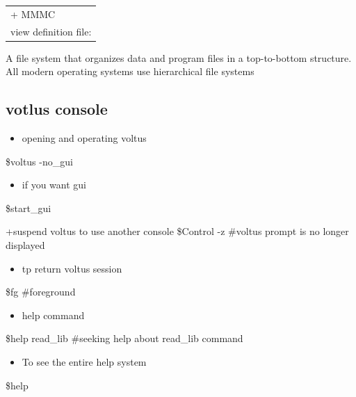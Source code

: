 \documentclass[a4paper]{article}
\begin{document}
\begin{center}
\begin{tabular}{l}
+ MMMC\\
view definition file:\\
\end{tabular}
\end{center}



A file system that organizes data and program files in a top-to-bottom structure.
All modern operating systems use hierarchical file systems


\subsection{votlus console}
\label{sec:org5fe3c40}
\begin{itemize}
\item opening and operating voltus
\end{itemize}
\$voltus -no\_gui
\begin{itemize}
\item if you want gui
\end{itemize}
\$start\_gui  

+suspend voltus to use another console
\$Control -z   \#voltus prompt is no longer displayed

\begin{itemize}
\item tp return voltus session
\end{itemize}
\$fg   \#foreground

\begin{itemize}
\item help command
\end{itemize}
\$help read\_lib    \#seeking help about read\_lib command


\begin{itemize}
\item To see the entire help system
\end{itemize}
\$help   
\end{document}
